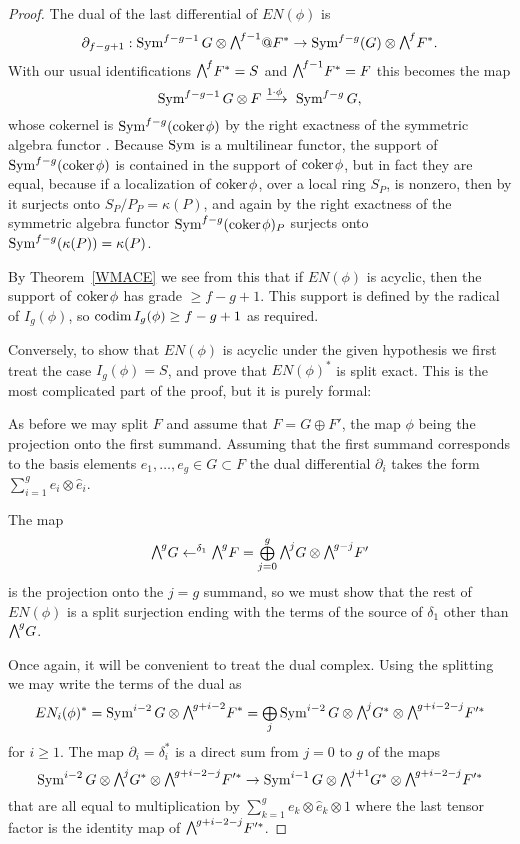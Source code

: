 \begin{proof}
The dual of the last differential of $EN(\phi)$ is
$$
\partial_{f-g+1}: \Sym^{f-g-1}G \otimes \mwedge^{f-1}@F^{*} \to
\Sym^{f-g}(G) \otimes \mwedge^{f}F^{*}.
$$
With our usual identifications $\mwedge^{f}F^{*} = S$ and
$\mwedge^{f-1}F^{*} = F$ this becomes the map
$$
\Sym^{f-g-1}G \otimes F \ruto {\!1\cdot \phi} \Sym^{f-g}G
,
$$
whose cokernel is $\operatorname{Sym}^{f-g}({\rm{coker}\kern1pt} \phi)$ by the right exactness of
the symmetric algebra functor \cite[Proposition A2.2]{Eisenbud1995}. 
Because $\operatorname{Sym}$ is a multilinear functor,
the
support of $\operatorname{Sym}^{f-g}({\rm{coker}\kern1pt} \phi)$ is contained in the support
of ${\rm{coker}\kern1pt} \phi$, but in fact they are equal,
because
if a localization of
${\rm{coker}\kern1pt} \phi$, over a local ring $S_{P}$,
is nonzero, then by
it surjects onto $S_{P}/P_{P} = \kappa(P)$, and again
%
by the right exactness
of the symmetric algebra functor $\operatorname{Sym}^{f-g}({\rm{coker}\kern1pt} \phi)_{P}$ surjects
onto
$\operatorname{Sym}^{f-g}(\kappa(P)) = \kappa(P)$.

By Theorem~\ref{WMACE} we see from this that if $EN(\phi)$ is acyclic,
then the support of ${\rm{coker}\kern1pt} \phi$
has grade $\geq f-g+1$. This support is defined by the radical of
$I_{g}(\phi)$, so $\operatorname{codim} I_{g}(\phi)\geq f-g+1$ as required.

Conversely, to show that $EN(\phi)$ is acyclic under the given hypothesis
we first treat the case
$I_{g}(\phi) = S$, and prove that $EN(\phi)^{*}$ is split exact. This
is the most complicated part of the proof,
but it is purely formal:

As before we may split $F$ and
assume that $F = G\oplus F'$, the map $\phi$ being the projection onto
the first summand.
Assuming that the first summand corresponds to the basis elements $e_{1},
\dots, e_{g}\in G\subset F$
the dual differential $\partial_{i}$ takes the form $\sum_{i=1}^{g}
e_{i}\otimes \hat e_{i}$.

The map
$$
\mwedge^{g}G\lTo^{\delta_{1}}
\mwedge^{g}F =\tsty\bigoplus\limits_{j=0}^{g}\mwedge^{j}G\otimes \mwedge^{g-j}F'
$$
is the projection onto the $j=g$ summand, so we must show that the rest
of $EN(\phi)$ is a split surjection
ending with the terms of the source of $\delta_{1}$ other than
$\mwedge^{g}G$.

Once again, it will be convenient to treat the dual complex. Using
the splitting
we may write the terms of the dual as
$$
EN_{i}(\phi)^{*} = \Sym^{i-2}G \otimes  \mwedge^{g+i-2}F^{*}  =
\tsty\bigoplus\limits_{j} \Sym^{i-2}G \otimes  \mwedge^{j}G^{*} \otimes
\mwedge^{g+i-2-j}F'^{*}
$$
for $i\geq 1$.
The map $\partial_{i}= \delta_{i}^{*}$ is a direct sum from $j=0$ to $g$
of the maps
$$
\Sym^{i-2}G \otimes  \mwedge^{j}G^{*} \otimes \mwedge^{g+i-2-j}F'^{*}
\to
\Sym^{i-1}G \otimes  \mwedge^{j+1}G^{*} \otimes \mwedge^{g+i-2-j}F'^{*}
$$
that are all equal to  multiplication by $\sum_{k=1}^{g} e_{k}\otimes
\hat e_{k}\otimes 1$
where the last tensor factor is the identity map of
$\mwedge^{g+i-2-j}F'^{*}$.


\end{proof}
